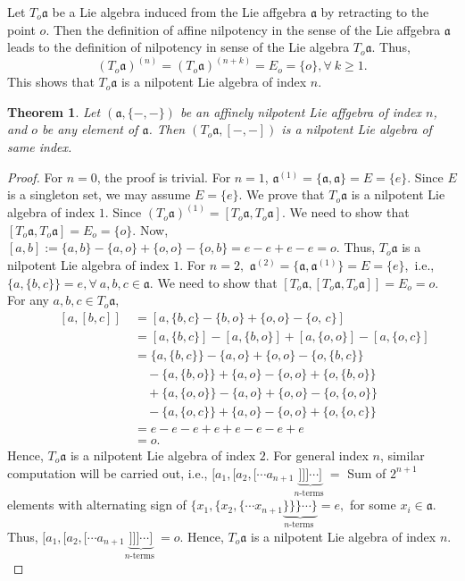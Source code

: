 \documentclass{article}
\newtheorem{theorem}{Theorem}[section]
\theoremstyle{definition}
\theoremstyle{remark}
\theoremstyle{plain}
\begin{document}
Let $T_o\mathfrak{a}$ be a Lie algebra induced from the Lie affgebra $\mathfrak{a}$ by retracting to the point $o.$ Then the definition of affine nilpotency in the sense of the Lie affgebra $\mathfrak{a}$ leads to the definition of nilpotency in sense of the Lie algebra $T_o\mathfrak{a}$. Thus, $$(T_o\mathfrak{a})^{(n)}=(T_o\mathfrak{a})^{(n+k)}=E_o=\{o\}, \forall~ k\geq 1.$$
This shows that $T_o\mathfrak{a}$ is a nilpotent Lie algebra of index $n.$
\begin{theorem}\label{affgebra nilpotent to algebra nilpotent}
    Let $(\mathfrak{a}, \{-, -\})$ be an affinely nilpotent Lie affgebra of index $n$, and $o$ be any element of $\mathfrak{a}$. Then $(T_o\mathfrak{a}, [-,-])$ is a nilpotent Lie algebra of same index.
    
\end{theorem}
\begin{proof}
For $n=0$, the proof is trivial. For $n=1$, $\mathfrak{a}^{(1)}=\{\mathfrak{a}, \mathfrak{a}\}=E=\{e\}.$ Since $E$ is a singleton set, we may assume $E=\{e\}$. We prove that $T_o\mathfrak{a}$ is a nilpotent Lie algebra of index $1.$ Since $(T_o\mathfrak{a})^{(1)}=[T_o\mathfrak{a}, T_o\mathfrak{a}].$ We need to show that $[T_o\mathfrak{a}, T_o\mathfrak{a}]=E_o=\lbrace o \rbrace$. Now, $[a, b]:=\{a, b\}-\{a,o\}+\{o,o\}-\{o,b\}=e-e+e-e= o.$ Thus, $T_o\mathfrak{a}$ is a nilpotent Lie algebra of index $1.$ For $n=2,$ $\mathfrak{a}^{(2)}=\{\mathfrak{a}, \mathfrak{a}^{(1)}\}=E=\{e\}$,~i.e., $\{a, \{b, c\}\}=e, \forall~ a, b,c \in \mathfrak{a}.$  We need to show that $[T_o\mathfrak{a}, [T_o\mathfrak{a}, T_o\mathfrak{a}]]=E_o=o$. For any $a, b, c\in T_o\mathfrak{a}$, 
 \begin{align*}
      \quad \quad [a,[b, c]] &\ =[a, \{b, c\}-\{b, o\}+\{o,o\}-\{o,  \,c\}]\\
     &\ =  [a, \{b,c\}]-[a, \{b,o\}]+[a, \{o,o\}]-[a, \{o,c\}]\\
     &\ = \{a,\{b, c\}\}- \{a, o\}+\{o, o\}-\{o, \{b, c\}\}\\
     &\ \quad -\{a,\{b, o\}\}+ \{a, o\}-\{o, o\}+\{o, \{b, o\}\}\\
     &\ \quad +\{a,\{o, o\}\}- \{a, o\}+\{o, o\}-\{o, \{o, o\}\}\\
     &\ \quad -\{a,\{o, c\}\}+ \{a, o\}-\{o, o\}+\{o, \{o, c\}\}\\
     &\ = e-e-e+e+e-e-e+e\\
     &\ =o.
 \end{align*}
 Hence, $T_o\mathfrak{a}$ is a nilpotent Lie algebra of index $2.$ For general index $n$, similar computation will be carried out, i.e., $[a_1, [a_2, [\cdots a_{n+1}\underbrace{]]]\cdots ]}_{n \text{-terms }}=$ Sum of $2^{n+1}$ elements with alternating sign of $\{x_1, \{x_2, \{\cdots x_{n+1}\underbrace{\}\}\}\cdots \}}_{n \text{-terms }}=e,$ for some $x_i\in \mathfrak{a}$. Thus, $[a_1, [a_2, [\cdots a_{n+1}\underbrace{]]]\cdots ]}_{n \text{-terms }}=o.$ Hence, $T_o\mathfrak{a}$ is a nilpotent Lie algebra of index $n.$
\end{proof}
\end{document}
